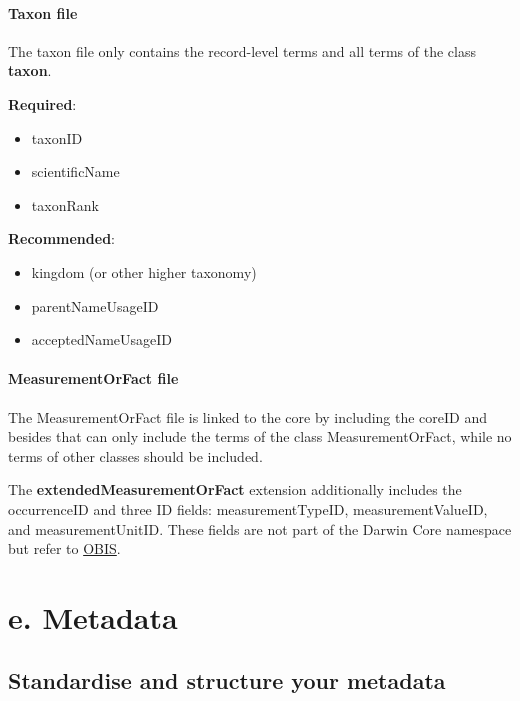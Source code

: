 \documentclass[
]{book}
\begin{document}
\hypertarget{taxon-file}{%
\subsection{Taxon file}\label{taxon-file}}

The taxon file only contains the record-level terms and all terms of the class \textbf{taxon}.

\textbf{Required}:

\begin{itemize}
\item
  taxonID
\item
  scientificName
\item
  taxonRank
\end{itemize}

\textbf{Recommended}:

\begin{itemize}
\item
  kingdom {(or other higher taxonomy)}
\item
  parentNameUsageID
\item
  acceptedNameUsageID
\end{itemize}

\hypertarget{measurementorfact-file}{%
\subsection{MeasurementOrFact file}\label{measurementorfact-file}}

The MeasurementOrFact file is linked to the core by including the coreID and besides that can only include the terms of the class MeasurementOrFact, while no terms of other classes should be included.

The \textbf{extendedMeasurementOrFact} extension additionally includes the occurrenceID and three ID fields: measurementTypeID, measurementValueID, and measurementUnitID. These fields are not part of the Darwin Core namespace but refer to \protect\hyperlink{OBIS}{OBIS}.

\hypertarget{part-e.-metadata}{%
\part*{e. Metadata}\label{part-e.-metadata}}

\hypertarget{standardise-and-structure-your-metadata}{%
\chapter{Standardise and structure your metadata}\label{standardise-and-structure-your-metadata}}
\end{document}
